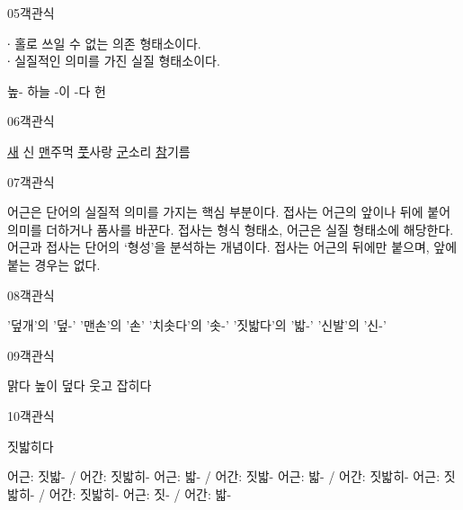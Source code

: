 \documentclass[fs9,seriesRus]{korfarm-base}
\begin{document}
\begin{kfQBlock}{05}{객관식}
\begin{kfEvidence}∙ 홀로 쓰일 수 없는 의존 형태소이다.   \\\relax
   ∙ 실질적인 의미를 가진 실질 형태소이다.\end{kfEvidence}
\begin{kfChoices}
\kfChoice 높-
\kfChoice 하늘
\kfChoice -이
\kfChoice -다
\kfChoice 헌
\end{kfChoices}
\end{kfQBlock}
\begin{kfQBlock}{06}{객관식}
\begin{kfChoices}
\kfChoice \uline{새} 신
\kfChoice \uline{맨}주먹
\kfChoice \uline{풋}사랑
\kfChoice \uline{군}소리
\kfChoice \uline{참}기름
\end{kfChoices}
\end{kfQBlock}
\begin{kfQBlock}{07}{객관식}
\begin{kfChoices}
\kfChoice 어근은 단어의 실질적 의미를 가지는 핵심 부분이다.
\kfChoice 접사는 어근의 앞이나 뒤에 붙어 의미를 더하거나 품사를 바꾼다.
\kfChoice 접사는 형식 형태소, 어근은 실질 형태소에 해당한다.
\kfChoice 어근과 접사는 단어의 ‘형성’을 분석하는 개념이다.
\kfChoice 접사는 어근의 뒤에만 붙으며, 앞에 붙는 경우는 없다.
\end{kfChoices}
\end{kfQBlock}
\begin{kfQBlock}{08}{객관식}
\begin{kfChoices}
\kfChoice '덮개'의 '덮-'
\kfChoice '맨손'의 '손'
\kfChoice '치솟다'의 '솟-'
\kfChoice '짓밟다'의 '밟-'
\kfChoice '신발'의 '신-'
\end{kfChoices}
\end{kfQBlock}
\begin{kfQBlock}{09}{객관식}
\begin{kfChoices}
\kfChoice 맑다
\kfChoice 높이
\kfChoice 덮다
\kfChoice 웃고
\kfChoice 잡히다
\end{kfChoices}
\end{kfQBlock}
\begin{kfQBlock}{10}{객관식}
\begin{kfEvidence}짓밟히다\end{kfEvidence}
\begin{kfChoices}
\kfChoice 어근: 짓밟- / 어간: 짓밟히-
\kfChoice 어근: 밟- / 어간: 짓밟-
\kfChoice 어근: 밟- / 어간: 짓밟히-
\kfChoice 어근: 짓밟히- / 어간: 짓밟히-
\kfChoice 어근: 짓- / 어간: 밟-
\end{kfChoices}
\end{kfQBlock}
\end{document}

